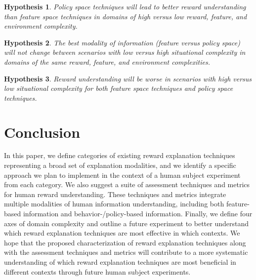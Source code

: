 \documentclass[letterpaper]{article} %
\newtheorem{hyp}{Hypothesis}
\begin{document}
\begin{hyp}
Policy space techniques will lead to better reward understanding than feature space techniques in domains of high versus low reward, feature, and environment complexity.
\end{hyp}


\begin{hyp}
The best modality of information (feature versus policy space) will not change between scenarios with low versus high situational complexity in domains of the same reward, feature, and environment complexities.
\end{hyp}

\begin{hyp}
Reward understanding will be worse in scenarios with high versus low situational complexity for both feature space techniques and policy space techniques.
\end{hyp}


\section{Conclusion}
\label{conclusion}
In this paper, we define categories of existing reward explanation techniques representing a broad set of explanation modalities, and we identify a specific approach we plan to implement in the context of a human subject experiment from each category. We also suggest a suite of assessment techniques and metrics for human reward understanding. These techniques and metrics integrate multiple modalities of human information understanding, including both feature-based information and behavior-/policy-based information. Finally, we define four axes of domain complexity and outline a future experiment to better understand which reward explanation techniques are most effective in which contexts. We hope that the proposed characterization of reward explanation techniques along with the assessment techniques and metrics will contribute to a more systematic understanding of which reward explanation techniques are most beneficial in different contexts through future human subject experiments.
\end{document}

